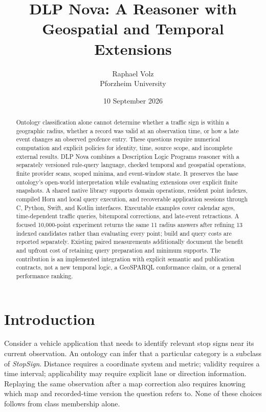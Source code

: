 \documentclass{article}
\title{DLP Nova: A Reasoner with Geospatial and Temporal Extensions}
\author{Raphael Volz\\Pforzheim University}
\date{10 September 2026}
\begin{document}
\maketitle
\begin{abstract}
Ontology classification alone cannot determine whether a traffic sign is within
a geographic radius, whether a record was valid at an observation time, or how
a late event changes an observed geofence entry. These questions require
numerical computation and explicit policies for identity, time, source scope,
and incomplete external results. DLP Nova combines a Description Logic Programs
reasoner with a separately versioned rule-query language, checked temporal and
geospatial operations, finite provider scans, scoped minima, and event-window
state. It preserves the base ontology's open-world interpretation while
evaluating extensions over explicit finite snapshots. A shared native library
supports domain operations, resident point indexes, compiled Horn and local
query execution, and recoverable application sessions through C, Python, Swift,
and Kotlin interfaces. Executable examples cover calendar ages, time-dependent
traffic queries, bitemporal corrections, and late-event retractions. A focused
10,000-point experiment returns the same 11 radius answers after refining 13
indexed candidates rather than evaluating every point; build and query costs
are reported separately. Existing paired measurements additionally document
the benefit and upfront cost of retaining query preparation and minimum
supports. The contribution is an implemented integration with explicit semantic
and publication contracts, not a new temporal logic, a GeoSPARQL conformance
claim, or a general performance ranking.
\end{abstract}

\section{Introduction}
Consider a vehicle application that needs to identify relevant stop signs near
its current observation. An ontology can infer that a particular category is a
subclass of \emph{StopSign}. Distance requires a coordinate system and metric;
validity requires a time interval; applicability may require explicit lane or
direction information. Replaying the same observation after a map correction
also requires knowing which map and recorded-time version the question refers
to. None of these choices follows from class membership alone.
\end{document}
